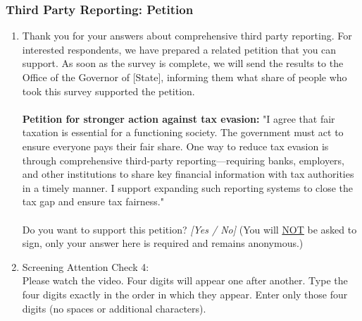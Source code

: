 \documentclass[11pt]{article}
\newcommand{\tk}[1]{\textcolor{orange}{#1}}
\begin{document}
\subsubsection*{Third Party Reporting: Petition}
\begin{enumerate}[resume]
    \item Thank you for your answers about comprehensive third party reporting. For interested respondents, we have prepared a related petition that you can support.  As soon as the survey is complete, we will send the results to the Office of the Governor of [State], informing them what share of people who took this survey supported the petition. \\ \\
    \textbf{Petition for stronger action against tax evasion:} "I agree that fair taxation is essential for a functioning society. The government must act to ensure everyone pays their fair share. One way to reduce tax evasion is through comprehensive third-party reporting---requiring banks, employers, and other institutions to share key financial information with tax authorities in a timely manner. I support expanding such reporting systems to close the tax gap and ensure tax fairness." \\ \\
        Do you want to support this petition? \textit{[Yes / No]} (You will \underline{NOT} be asked to sign, only your answer here is required and remains anonymous.)

    \item Screening Attention Check 4:\\ 
    Please watch the video. Four digits will appear one after another. Type the four digits exactly in the order in which they appear. Enter only those four digits (no spaces or additional characters).
\end{enumerate}
\end{document}
